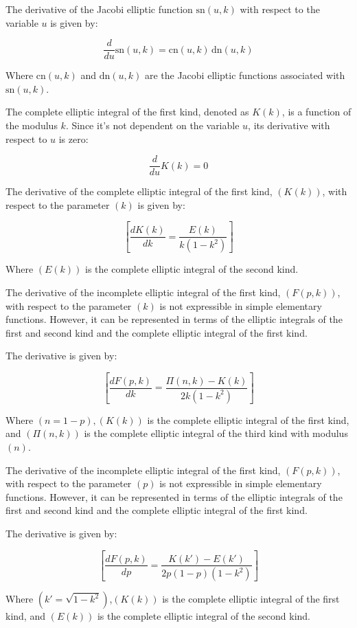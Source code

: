 The derivative of the Jacobi elliptic function $\text{sn}(u, k)$ with respect to the variable $u$ is given by:

$$
\frac{d}{du} \text{sn}(u, k) = \text{cn}(u, k) \, \text{dn}(u, k)
$$

Where $\text{cn}(u, k)$ and $\text{dn}(u, k)$ are the Jacobi elliptic functions associated with $\text{sn}(u, k)$.

The complete elliptic integral of the first kind, denoted as $K(k)$, is a function of the modulus $k$. Since it's not dependent on the variable $u$, its derivative with respect to $u$ is zero:

$$
\frac{d}{du} K(k) = 0
$$

The derivative of the complete elliptic integral of the first kind, $( K(k) )$, with respect to the parameter $( k )$ is given by:

$$[ \frac{dK(k)}{dk} = \frac{E(k)}{k(1-k^2)} ]$$

Where $( E(k) )$ is the complete elliptic integral of the second kind.


The derivative of the incomplete elliptic integral of the first kind, $( F(p, k) )$, with respect to the parameter $( k )$ is not expressible in simple elementary functions. However, it can be represented in terms of the elliptic integrals of the first and second kind and the complete elliptic integral of the first kind.

The derivative is given by:

$$[ \frac{dF(p, k)}{dk} = \frac{\Pi(n, k) - K(k)}{2k(1-k^2)} ]$$

Where $ ( n = 1 - p ), ( K(k) )$ is the complete elliptic integral of the first kind, and $( \Pi(n, k) )$ is the complete elliptic integral of the third kind with modulus $( n )$.

The derivative of the incomplete elliptic integral of the first kind, $( F(p, k) )$, with respect to the parameter $( p )$ is not expressible in simple elementary functions. However, it can be represented in terms of the elliptic integrals of the first and second kind and the complete elliptic integral of the first kind.

The derivative is given by:

$$[ \frac{dF(p, k)}{dp} = \frac{K(k') - E(k')}{2p(1-p)(1-k^2)} ]$$

Where $( k' = \sqrt{1 - k^2} )$,$ ( K(k) )$ is the complete elliptic integral of the first kind, and $( E(k) )$ is the complete elliptic integral of the second kind.